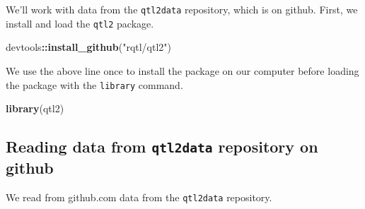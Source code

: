 \documentclass[oneside]{book}
\newenvironment{Shaded}{\begin{snugshade}}{\end{snugshade}}
\newcommand{\KeywordTok}[1]{\textcolor[rgb]{0.13,0.29,0.53}{\textbf{#1}}}
\newcommand{\NormalTok}[1]{#1}
\newcommand{\OperatorTok}[1]{\textcolor[rgb]{0.81,0.36,0.00}{\textbf{#1}}}
\newcommand{\StringTok}[1]{\textcolor[rgb]{0.31,0.60,0.02}{#1}}
\begin{document}
We'll work with data from the \texttt{qtl2data} repository, which is on
github. First, we install and load the \texttt{qtl2} package.

\begin{Shaded}
\begin{Highlighting}[]
\NormalTok{devtools}\OperatorTok{::}\KeywordTok{install_github}\NormalTok{(}\StringTok{"rqtl/qtl2"}\NormalTok{)}
\end{Highlighting}
\end{Shaded}

We use the above line once to install the package on our computer before
loading the package with the \texttt{library} command.

\begin{Shaded}
\begin{Highlighting}[]
\KeywordTok{library}\NormalTok{(qtl2)}
\end{Highlighting}
\end{Shaded}

\hypertarget{reading-data-from-qtl2data-repository-on-github}{%
\subsection{\texorpdfstring{Reading data from \texttt{qtl2data}
repository on
github}{Reading data from qtl2data repository on github}}\label{reading-data-from-qtl2data-repository-on-github}}

We read from github.com data from the \texttt{qtl2data} repository.
\end{document}
